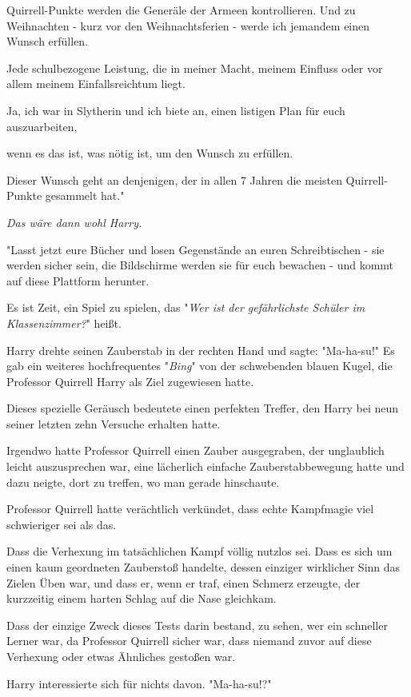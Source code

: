 {Quirrell-Punkte werden die Generäle der Armeen kontrollieren. Und zu Weihnachten - kurz vor den Weihnachtsferien - werde ich jemandem einen Wunsch erfüllen.

Jede schulbezogene Leistung, die in meiner Macht, meinem Einfluss oder vor allem meinem Einfallsreichtum liegt.

Ja, ich war in Slytherin und ich biete an, einen listigen Plan für euch auszuarbeiten,

wenn es das ist, was nötig ist, um den Wunsch zu erfüllen.

Dieser Wunsch geht an denjenigen, der in allen 7 Jahren die meisten Quirrell-Punkte gesammelt hat."

\emph{Das wäre dann wohl Harry.}

"Lasst jetzt eure Bücher und losen Gegenstände an euren Schreibtischen - sie werden sicher sein, die Bildschirme werden sie für euch bewachen - und kommt auf diese Plattform herunter.

Es ist Zeit, ein Spiel zu spielen, das "\emph{Wer ist der gefährlichste Schüler im Klassenzimmer?}" heißt.

Harry drehte seinen Zauberstab in der rechten Hand und sagte: "Ma-ha-su!" Es gab ein weiteres hochfrequentes "\emph{Bing}" von der schwebenden blauen Kugel, die Professor Quirrell Harry als Ziel zugewiesen hatte.

Dieses spezielle Geräusch bedeutete einen perfekten Treffer, den Harry bei neun seiner letzten zehn Versuche erhalten hatte.

Irgendwo hatte Professor Quirrell einen Zauber ausgegraben, der unglaublich leicht auszusprechen war, eine lächerlich einfache Zauberstabbewegung hatte und dazu neigte, dort zu treffen, wo man gerade hinschaute.

Professor Quirrell hatte verächtlich verkündet, dass echte Kampfmagie viel schwieriger sei als das.

Dass die Verhexung im tatsächlichen Kampf völlig nutzlos sei. Dass es sich um einen kaum geordneten Zauberstoß handelte, dessen einziger wirklicher Sinn das Zielen Üben war, und dass er, wenn er traf, einen Schmerz erzeugte, der kurzzeitig einem harten Schlag auf die Nase gleichkam.

Dass der einzige Zweck dieses Tests darin bestand, zu sehen, wer ein schneller Lerner war, da Professor Quirrell sicher war, dass niemand zuvor auf diese Verhexung oder etwas Ähnliches gestoßen war.

Harry interessierte sich für nichts davon. "Ma-ha-su!?"

}

